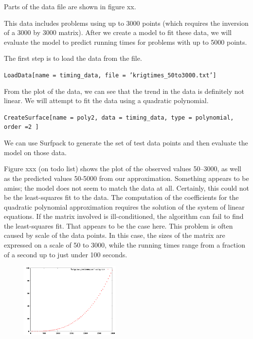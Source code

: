 \documentclass{article}
\begin{document}
Parts of the data file are shown in figure xx.
 

This data includes problems using up to 3000 points (which requires the inversion of a 3000 by 3000 matrix).  After we create a model to fit these data, we will evaluate the model to predict running times for problems with up to 5000 points.

The first step is to load the data from the file.

\texttt{LoadData[name = timing\_data, file = 'krigtimes\_50to3000.txt']}

From the plot of the data, we can see that the trend in the data is definitely not linear.  We will attempt to fit the data using a quadratic polynomial.

\texttt{CreateSurface[name = poly2, data = timing\_data, type = polynomial, order =2 ]}

We can use Surfpack to generate the set of test data points and then evaluate the model on those data. 



Figure xxx (on todo list) shows the plot of the observed values 50--3000, as well as the predicted values 50-5000 from our approximation.  Something appears to be amiss; the model does not seem to match the data at all.  Certainly, this could not be the least-squares fit to the data.  The computation of the coefficients for the quadratic polynomial approximation requires the solution of the system of linear equations.  If the matrix involved is ill-conditioned, the algorithm can fail to find the least-squares fit.  That appears to be the case here.  This problem is often caused by scale of the data points.  In this case, the sizes of the matrix are expressed on a scale of 50 to 3000, while the running times range from a fraction of a second up to just under 100 seconds.  

\begin{figure}[htbp]
\includegraphics[width=5cm]{kriging_times_50to3000.png}
\end{figure}
\end{document}
